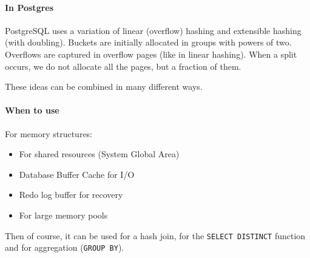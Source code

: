 \paragraph{In Postgres}
PostgreSQL uses a variation of linear (overflow) hashing and extensible hashing (with doubling).
Buckets are initially allocated in groups with powers of two. Overflows are captured in overflow pages (like in linear hashing).
When a split occurs, we do not allocate all the pages, but a fraction of them.

These ideas can be combined in many different ways.

\paragraph{When to use}
For memory structures:
\begin{itemize}
    \item For shared resources (System Global Area)
    \item Database Buffer Cache for I/O
    \item Redo log buffer for recovery
    \item For large memory pools
\end{itemize}

Then of course, it can be used for a hash join, for the \texttt{SELECT DISTINCT} function and for aggregation (\texttt{GROUP BY}).
